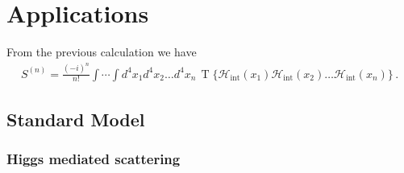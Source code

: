 \chapter{Applications}
\label{sec:scattering}
From the previous calculation we have
\begin{align}
S^{(n)}=  \frac{(-i)^n}{n!}\int\cdots\int d^4x_1 d^4x_2\ldots d^4x_n\,\operatorname{T}\{\mathcal{H}_{\text{int}}(x_1)\mathcal{H}_{\text{int}}(x_2)\ldots\mathcal{H}_{\text{int}}(x_n)\}\,.
\end{align}

\section{Standard Model}


\subsection{Higgs mediated scattering}
\label{sec:higgs-medi-scatt}

